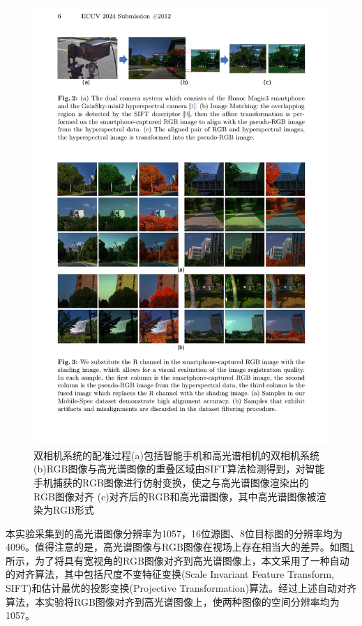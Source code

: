 \documentclass[
    type = master, %
    degree = academic,        %
    decl-page,  %
  ]{njuthesis}
\begin{document}

\begin{figure}[h]
	\centering
	\includegraphics[width=1.0\linewidth]{docs/fig-chap3/fig-3-align.pdf}
	\caption{双相机系统的配准过程\quad (a)包括智能手机和高光谱相机的双相机系统\quad (b)RGB图像与高光谱图像的重叠区域由SIFT\cite{J25}算法检测得到，对智能手机捕获的RGB图像进行仿射变换，使之与高光谱图像渲染出的RGB图像对齐 \quad (c)对齐后的RGB和高光谱图像，其中高光谱图像被渲染为RGB形式}
	\label{fig:enhance align}
\end{figure}

本实验采集到的高光谱图像分辨率为1057，16位源图、8位目标图的分辨率均为4096。值得注意的是，高光谱图像与RGB图像在视场上存在相当大的差异。如图\ref{fig:enhance align}所示，为了将具有宽视角的RGB图像对齐到高光谱图像上，本文采用了一种自动的对齐算法，其中包括尺度不变特征变换(Scale Invariant Feature Transform, SIFT)\cite{J25}和估计最优的投影变换(Projective Transformation)算法。经过上述自动对齐算法，本实验将RGB图像对齐到高光谱图像上，使两种图像的空间分辨率均为1057。
\end{document}
